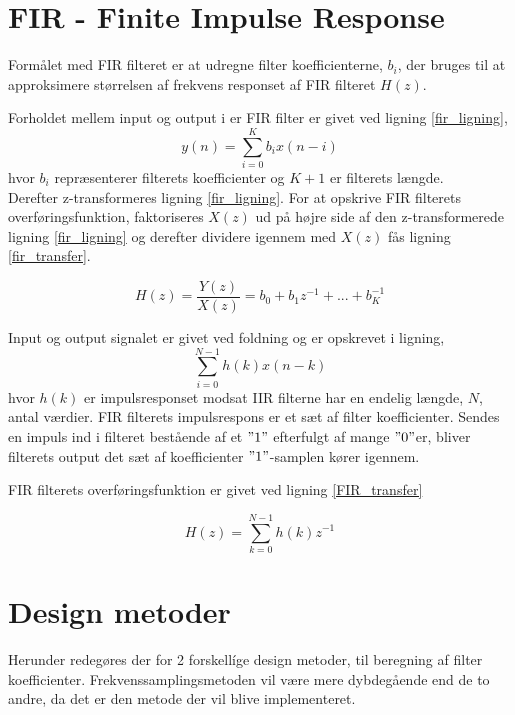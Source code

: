 \section{FIR - Finite Impulse Response}\label{sec:fir}
Formålet med FIR filteret er at udregne filter koefficienterne, $b_{i}$, der bruges til at approksimere størrelsen af frekvens responset af FIR filteret $H(z)$.



Forholdet mellem input og output i er FIR filter er givet ved ligning \ref{fir_ligning},
\begin {equation} 
y(n)=\sum\limits_{i=0}^{K}b_{i}x(n-i) \label{fir_ligning}
\end {equation}
hvor $b_{i}$ repræsenterer filterets koefficienter og $K+1$ er filterets længde.
\\
Derefter z-transformeres ligning \ref{fir_ligning}. For at opskrive FIR filterets overføringsfunktion, faktoriseres $X(z)$ ud på højre side af den z-transformerede ligning \ref{fir_ligning} og derefter dividere igennem med $X(z)$ fås ligning \ref{fir_transfer}.

\begin {equation}
H(z)=\frac{Y(z)}{X(z)}=b_{0}+b_{1}z^{-1}+...+b_{K}^{-1} \label{fir_transfer}
\end {equation}

Input og output signalet er givet ved foldning og er opskrevet i ligning,
\begin {equation} 
\sum\limits_{i=0}^{N-1} h(k)x(n-k) 
\end {equation}
hvor $h(k)$ er impulsresponset modsat IIR filterne har en endelig længde, $N$, antal værdier. FIR filterets impulsrespons er et sæt af filter koefficienter. Sendes en impuls ind i filteret bestående af et $"1"$ efterfulgt af mange $"0"$er, bliver filterets output det sæt af koefficienter $"1"$-samplen kører igennem. 


FIR filterets overføringsfunktion er givet ved ligning \ref{FIR_transfer}

\begin {equation}
H(z)=\sum\limits_{k=0}^{N-1}h(k)z^{-1} \label{FIR_transfer}
\end {equation}

\section{Design metoder} \label{sec:fir_design}
Herunder redegøres der for 2 forskellíge design metoder, til beregning af filter koefficienter.
Frekvenssamplingsmetoden vil være mere dybdegående end de to andre, da det er den metode der vil blive implementeret.
